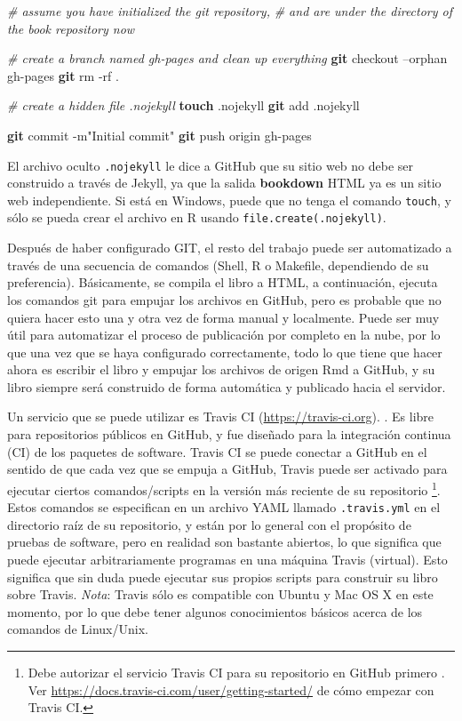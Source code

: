 \documentclass[12pt,]{krantz}
\makeatletter
\newenvironment{Shaded}{\begin{snugshade}}{\end{snugshade}}
\newcommand{\KeywordTok}[1]{\textcolor[rgb]{0.13,0.29,0.53}{\textbf{{#1}}}}
\newcommand{\StringTok}[1]{\textcolor[rgb]{0.31,0.60,0.02}{{#1}}}
\newcommand{\CommentTok}[1]{\textcolor[rgb]{0.56,0.35,0.01}{\textit{{#1}}}}
\newcommand{\NormalTok}[1]{{#1}}
\newenvironment{kframe}{%
\medskip{}
\setlength{\fboxsep}{.8em}
 \def\at@end@of@kframe{}%
 \ifinner\ifhmode%
  \def\at@end@of@kframe{\end{minipage}}%
  \begin{minipage}{\columnwidth}%
 \fi\fi%
 \def\FrameCommand##1{\hskip\@totalleftmargin \hskip-\fboxsep
 \colorbox{shadecolor}{##1}\hskip-\fboxsep
     \hskip-\linewidth \hskip-\@totalleftmargin \hskip\columnwidth}%
 \MakeFramed {\advance\hsize-\width
   \@totalleftmargin\z@ \linewidth\hsize
   \@setminipage}}%
 {\par\unskip\endMakeFramed%
 \at@end@of@kframe}
\renewenvironment{Shaded}{\begin{kframe}}{\end{kframe}}
\theoremstyle{definition}
\theoremstyle{definition}
\theoremstyle{remark}
\makeatother
\begin{document}
\begin{Shaded}
\begin{Highlighting}[]
\CommentTok{# assume you have initialized the git repository,}
\CommentTok{# and are under the directory of the book repository now}

\CommentTok{# create a branch named gh-pages and clean up everything}
\KeywordTok{git} \NormalTok{checkout --orphan gh-pages}
\KeywordTok{git} \NormalTok{rm -rf .}

\CommentTok{# create a hidden file .nojekyll}
\KeywordTok{touch} \NormalTok{.nojekyll}
\KeywordTok{git} \NormalTok{add .nojekyll}

\KeywordTok{git} \NormalTok{commit -m}\StringTok{"Initial commit"}
\KeywordTok{git} \NormalTok{push origin gh-pages}
\end{Highlighting}
\end{Shaded}

El archivo oculto \texttt{.nojekyll} le dice a GitHub que su sitio web
no debe ser construido a través de Jekyll, ya que la salida
\textbf{bookdown} HTML ya es un sitio web independiente. Si está en
Windows, puede que no tenga el comando \texttt{touch}, y sólo se pueda
crear el archivo en R usando
\texttt{file.create(\textquotesingle{}.nojekyll\textquotesingle{})}.

Después de haber configurado GIT, el resto del trabajo puede ser
automatizado a través de una secuencia de comandos (Shell, R o Makefile,
dependiendo de su preferencia). Básicamente, se compila el libro a HTML,
a continuación, ejecuta los comandos git para empujar los archivos en
GitHub, pero es probable que no quiera hacer esto una y otra vez de
forma manual y localmente. Puede ser muy útil para automatizar el
proceso de publicación por completo en la nube, por lo que una vez que
se haya configurado correctamente, todo lo que tiene que hacer ahora es
escribir el libro y empujar los archivos de origen Rmd a GitHub, y su
libro siempre será construido de forma automática y publicado hacia el
servidor.

Un servicio que se puede utilizar es Travis CI
(\url{https://travis-ci.org}). . Es libre para
repositorios públicos en GitHub, y fue diseñado para la integración
continua (CI) de los paquetes de software. Travis CI se puede conectar a
GitHub en el sentido de que cada vez que se empuja a GitHub, Travis
puede ser activado para ejecutar ciertos comandos/scripts en la versión
más reciente de su repositorio \footnote{Debe autorizar el servicio
  Travis CI para su repositorio en GitHub primero . Ver
  \url{https://docs.travis-ci.com/user/getting-started/} de cómo empezar
  con Travis CI.}. Estos comandos se especifican en un archivo YAML
llamado \texttt{.travis.yml} en el directorio raíz de su repositorio, y
están por lo general con el propósito de pruebas de software, pero en
realidad son bastante abiertos, lo que significa que puede ejecutar
arbitrariamente programas en una máquina Travis (virtual). Esto
significa que sin duda puede ejecutar sus propios scripts para construir
su libro sobre Travis. \emph{Nota}: Travis sólo es compatible con Ubuntu
y Mac OS X en este momento, por lo que debe tener algunos conocimientos
básicos acerca de los comandos de Linux/Unix.
\end{document}
